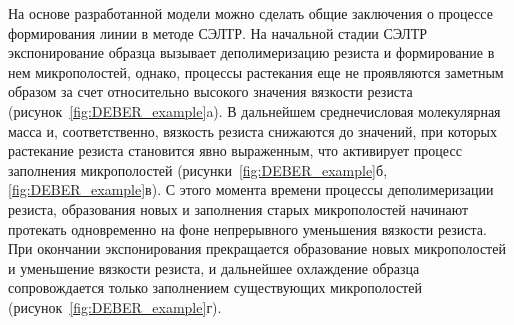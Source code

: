На основе разработанной модели можно сделать общие заключения о процессе формирования линии в методе СЭЛТР.
На начальной стадии СЭЛТР экспонирование образца вызывает деполимеризацию резиста и формирование в нем микрополостей, однако, процессы растекания еще не проявляются заметным образом за счет относительно высокого значения вязкости резиста (рисунок~\ref{fig:DEBER_example}a).
В дальнейшем среднечисловая молекулярная масса и, соответственно, вязкость резиста снижаются до значений, при которых растекание резиста становится явно выраженным, что активирует процесс заполнения микрополостей (рисунки~\ref{fig:DEBER_example}б, \ref{fig:DEBER_example}в).
С этого момента времени процессы деполимеризации резиста, образования новых и заполнения старых микрополостей начинают протекать одновременно на фоне непрерывного уменьшения вязкости резиста.
При окончании экспонирования прекращается образование новых микрополостей и уменьшение вязкости резиста, и дальнейшее охлаждение образца сопровождается только заполнением существующих микрополостей (рисунок~\ref{fig:DEBER_example}г).

